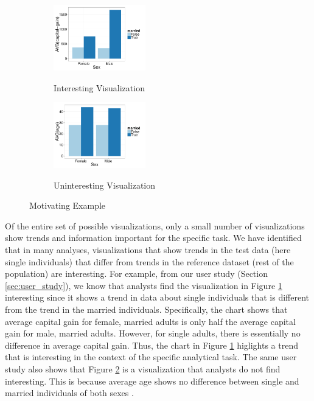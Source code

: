 \begin{example}
\begin{figure}[h]
	\centering
	\begin{subfigure}{0.49\linewidth}
		{\includegraphics[width=4cm] {Images/HUHI_sex_avg_cap_gain.pdf}}
		\caption{Interesting Visualization}
		\label{fig:interesting_viz} 
	\end{subfigure}
	\begin{subfigure}{0.49\linewidth}
		\centering
		{\includegraphics[width=4cm] {Images/LULI_sex_avg_age.pdf}}
		\caption{Uninteresting Visualization}
		\label{fig:uninteresting_viz}
	\end{subfigure}
	\vspace{-10pt}
	\caption{Motivating Example}
	\label{fig:intro}
	\vspace{-15pt}
\end{figure}

Of the entire set of possible visualizations, only a small number of visualizations
show trends and information important for the specific task.
We have identified that in many analyses, visualizations that show trends in the test 
data (here single individuals) that differ from trends in the reference dataset (rest of the population)
are interesting.
For example, from our user study (Section \ref{sec:user_study}), we know that
analysts find the visualization in Figure \ref{fig:interesting_viz} interesting since it shows 
a trend in data about single individuals that is different from the trend in the married individuals.
Specifically, the chart shows that average capital gain for female, married adults is only
half the average capital gain for male, married adults.
However, for single adults, there is essentially no difference in average capital gain.
Thus, the chart in Figure \ref{fig:interesting_viz} higlights a trend that is interesting in the context 
of the specific analytical task.
The same user study also shows that Figure \ref{fig:uninteresting_viz} is a visualization that analysts 
do not find interesting. 
This is because average age shows no difference between single and married individuals of both sexes .


\end{example}
